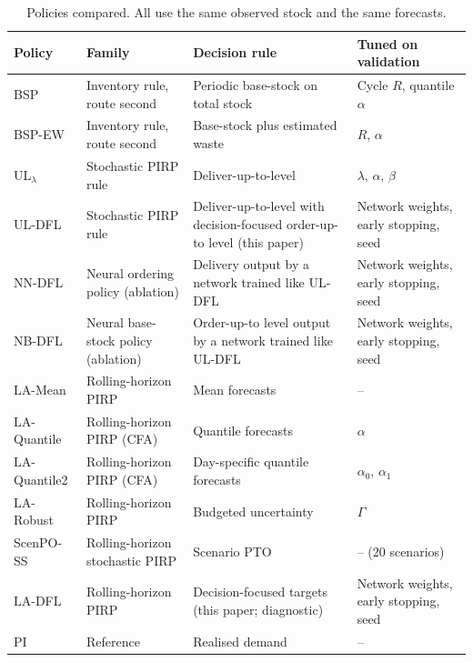\begin{table}[H]
\centering\small
\caption{Policies compared. All use the same observed stock and the same forecasts.}\label{tab:policies}
\begin{tabular}{>{\raggedright\arraybackslash}p{2.3cm}>{\raggedright\arraybackslash}p{3.1cm}>{\raggedright\arraybackslash}p{4.6cm}>{\raggedright\arraybackslash}p{3.4cm}}
\toprule
Policy & Family & Decision rule & Tuned on validation \\
\midrule
BSP & Inventory rule, route second & Periodic base-stock on total stock & Cycle $R$, quantile $\alpha$ \\
BSP-EW & Inventory rule, route second & Base-stock plus estimated waste \citep{broekmeulen2009heuristic,haijema2019improved} & $R$, $\alpha$ \\
UL$_\lambda$ & Stochastic PIRP rule & Deliver-up-to-level \citep{crama2018stochastic} & $\lambda$, $\alpha$, $\beta$ \\
UL-DFL & Stochastic PIRP rule & Deliver-up-to-level with decision-focused order-up-to level (this paper) & Network weights, early stopping, seed \\
NN-DFL & Neural ordering policy (ablation) & Delivery output by a network trained like UL-DFL \citep{alvo2023neural} & Network weights, early stopping, seed \\
NB-DFL & Neural base-stock policy (ablation) & Order-up-to level output by a network trained like UL-DFL & Network weights, early stopping, seed \\
LA-Mean & Rolling-horizon PIRP & Mean forecasts & -- \\
LA-Quantile & Rolling-horizon PIRP (CFA) & Quantile forecasts & $\alpha$ \\
LA-Quantile2 & Rolling-horizon PIRP (CFA) & Day-specific quantile forecasts & $\alpha_0$, $\alpha_1$ \\
LA-Robust & Rolling-horizon PIRP & Budgeted uncertainty \citep{bertsimas2006robust} & $\Gamma$ \\
ScenPO-SS & Rolling-horizon stochastic PIRP & Scenario PTO \citep{jia2025scenario} & -- (20 scenarios) \\
LA-DFL & Rolling-horizon PIRP & Decision-focused targets (this paper; diagnostic) & Network weights, early stopping, seed \\
PI & Reference & Realised demand & -- \\
\bottomrule
\end{tabular}
\end{table}


